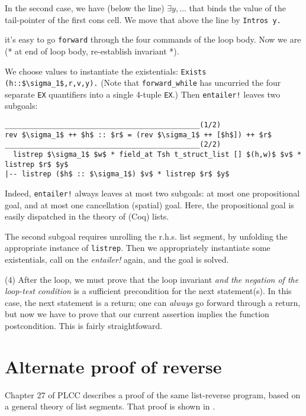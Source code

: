 \documentclass[12pt,fleqn,openany,oneside,showtrims]{memoir}
\begin{document}
In the second case, we have (below the line)
$\exists y, \ldots$ that binds the value of the
tail-pointer of the first cons cell.  We move that above
the line by \lstinline{Intros y.}

  it's easy to go \lstinline{forward} through the four commands
  of the loop body.  Now we are
  \textsf{(* at end of loop body, re-establish invariant *).}

We choose values to instantiate the existentials:
\lstinline{Exists (h::$\sigma_1$,r,v,y).}  (Note that
\lstinline{forward_while} has uncurried
the four separate \lstinline{EX} quantifiers
into a single 4-tuple \lstinline{EX}.)  Then
\lstinline{entailer!} leaves two subgoals:
\begin{lstlisting}
______________________________________________(1/2)
rev $\sigma_1$ ++ $h$ :: $r$ = (rev $\sigma_1$ ++ [$h$]) ++ $r$
______________________________________________(2/2)
  listrep $\sigma_1$ $w$ * field_at Tsh t_struct_list [] $(h,w)$ $v$ * listrep $r$ $y$
|-- listrep ($h$ :: $\sigma_1$) $v$ * listrep $r$ $y$
\end{lstlisting}

Indeed, \lstinline{entailer!} always leaves at most two subgoals:
at most one propositional goal, and at most one
cancellation (spatial) goal.
Here, the propositional goal is easily dispatched in the
theory of (Coq) lists.

The second subgoal requires unrolling the r.h.s. list segment,
\label{unroll-the-list}
by unfolding the appropriate instance of \lstinline{listrep}.
Then we appropriately instantiate some existentials,
call on the \emph{entailer!} again, and the goal is solved.

(4) After the loop, we must prove that the loop invariant
\emph{and the negation of the loop-test condition} is a sufficient
precondition for the next statement(s).  In this case,
the next statement is a return; one can \emph{always}
go forward through a return, but now we have to prove
that our current assertion implies the function postcondition.
This is fairly straightfoward.

\chapter{Alternate proof of \textsf{reverse}}
\label{refcard:reverse-orig}

Chapter 27 of PLCC describes a proof of the same list-reverse program,
based on a general theory of list segments.  That proof is shown
in .
\end{document}
